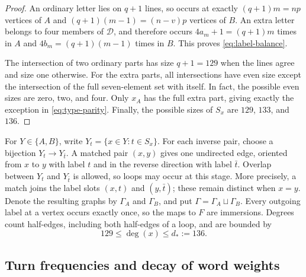 \begin{proof}
An ordinary letter lies on \(q+1\) lines, so occurs at exactly
\((q+1)m=np\) vertices of \(A\) and \((q+1)(m-1)=(n-v)p\)
vertices of \(B\).  An extra letter belongs to four members of
\(\mathcal D\), and therefore occurs \(4a_m+1=(q+1)m\) times in
\(A\) and \(4b_m=(q+1)(m-1)\) times in \(B\).
This proves \eqref{eq:label-balance}.

The intersection of two ordinary parts has size \(q+1=129\) when
the lines agree and size one otherwise.  For the extra parts, all
intersections have even size except the intersection of the full
seven-element set with itself.  In fact, the possible even sizes are
zero, two, and four.  Only \(x_A\) has the full extra part, giving
exactly the exception in \eqref{eq:type-parity}.  Finally, the possible
sizes of \(S_x\) are \(129\), \(133\), and \(136\).
\end{proof}

For \(Y\in\{A,B\}\), write
\(Y_t=\{x\in Y:t\in S_x\}\).  For each inverse pair, choose a
bijection \(Y_t\to Y_{\bar t}\).  A matched pair \((x,y)\) gives
one undirected edge, oriented from \(x\) to \(y\) with label \(t\)
and in the reverse direction with label \(\bar t\).  Overlap between
\(Y_t\) and \(Y_{\bar t}\) is allowed, so loops may occur at this
stage.  More precisely, a match joins the label slots \((x,t)\) and
\((y,\bar t)\); these remain distinct when \(x=y\).
Denote the resulting graphs by \(\Gamma_A\) and \(\Gamma_B\),
and put \(\Gamma=\Gamma_A\sqcup\Gamma_B\).  Every outgoing label
at a vertex occurs exactly once, so the maps to \(F\) are immersions.
Degrees count half-edges, including both half-edges of a loop, and
are bounded by
\begin{equation}\label{eq:degree-bound}
 129\le\deg(x)\le d_*:=136.
\end{equation}

\subsection{Turn frequencies and decay of word weights}

